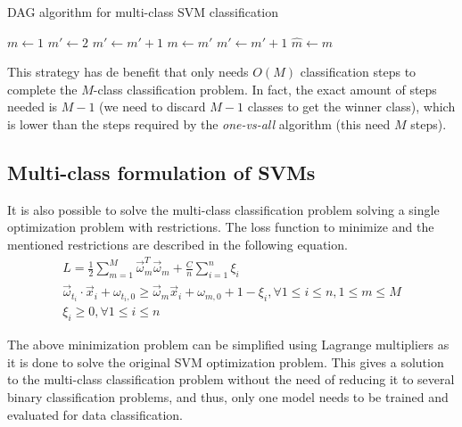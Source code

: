 \documentclass[10pt,a4paper]{article}
\begin{document}
\begin{algorithm}[h]
\caption{DAG algorithm for multi-class SVM classification}
\label{alg:dag}
\begin{algorithmic}
\State $m \leftarrow 1$
\State $m' \leftarrow 2$
	\State $m' \leftarrow m' + 1$ 
\Else {}
	\State $m \leftarrow m'$
	\State $m' \leftarrow m' + 1$
\EndIf
\EndWhile
\State $\hat{m} \leftarrow m$
\end{algorithmic}
\end{algorithm}

This strategy has de benefit that only needs $O(M)$ classification steps to complete the $M$-class classification problem. In fact, the exact amount of steps needed is $M-1$ (we need to discard $M-1$ classes to get the winner class), which is lower than the steps required by the \emph{one-vs-all} algorithm (this need $M$ steps).

\subsection{Multi-class formulation of SVMs}\label{sec:multiclass}
It is also possible to solve the multi-class classification problem solving a single optimization problem\cite{crammer2002algorithmic} with restrictions. The loss function to minimize and the mentioned restrictions are described in the following equation.\\

\begin{eqnarray}
L = \frac{1}{2} \sum_{m=1}^{M} \vec{\omega}_m^T \vec{\omega}_m + \frac{C}{n} \sum_{i=1}^n \xi_i\\
\vec{\omega}_{t_i} \cdot \vec{x}_i + \omega_{t_i,0} \geq \vec{\omega}_m \vec{x}_i + \omega_{m,0} + 1 - \xi_i, \forall 1 \leq i \leq n, 1 \leq m \leq M \\
\xi_i \geq 0, \forall 1 \leq i \leq n
\end{eqnarray}

The above minimization problem can be simplified using Lagrange multipliers as it is done to solve the original SVM optimization problem. This gives a solution to the multi-class classification problem without the need of reducing it to several binary classification problems, and thus, only one model needs to be trained and evaluated for data classification.
\end{document}
